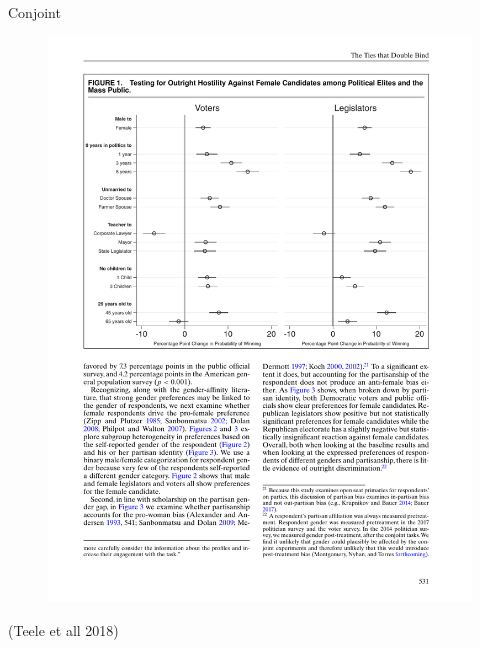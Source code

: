 \documentclass[
  ignorenonframetext,
]{beamer}
\begin{document}
\begin{frame}{Conjoint}
\protect\hypertarget{conjoint-1}{}
\begin{figure}

{\centering \includegraphics[width=0.8\linewidth]{./figs/survey-exp-teele-2018-results} 

}

\end{figure}

(Teele et all 2018)
\end{frame}
\end{document}
